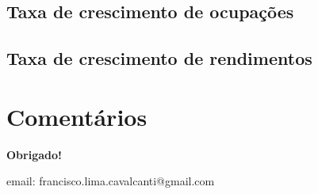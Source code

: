 \documentclass[10pt]{beamer}
\begin{document}
\subsection{Taxa de crescimento de ocupações}

\begin{frame}
\textit{\hyperlink{indice_principal}{}}

\end{frame}


\begin{frame}
\textit{\hyperlink{indice_principal}{}}

\end{frame}


\begin{frame}
\textit{\hyperlink{indice_principal}{}}

\end{frame}

\subsection{Taxa de crescimento de rendimentos}

\begin{frame}
\textit{\hyperlink{indice_principal}{}}

\end{frame}


\begin{frame}
\textit{\hyperlink{indice_principal}{}}

\end{frame}


\begin{frame}
\textit{\hyperlink{indice_principal}{}}

\end{frame}



\section{Comentários}


\frame
{
\begin{center}
	\vfill
	\textbf{Obrigado!}
	\\

	\begin{small}
	email: francisco.lima.cavalcanti@gmail.com
	\end{small}
	\vfill     
\end{center}
}
\end{document}
